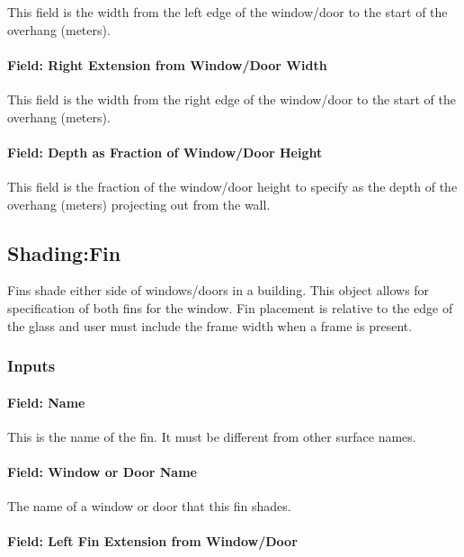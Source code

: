 This field is the width from the left edge of the window/door to the start of the overhang (meters).

\paragraph{Field: Right Extension from Window/Door Width}\label{field-right-extension-from-windowdoor-width-1}

This field is the width from the right edge of the window/door to the start of the overhang (meters).

\paragraph{Field: Depth as Fraction of Window/Door Height}\label{field-depth-as-fraction-of-windowdoor-height}

This field is the fraction of the window/door height to specify as the depth of the overhang (meters) projecting out from the wall.

\subsection{Shading:Fin}\label{shadingfin}

Fins shade either side of windows/doors in a building. This object allows for specification of both fins for the window. Fin placement is relative to the edge of the glass and user must include the frame width when a frame is present.

\subsubsection{Inputs}\label{inputs-28-002}

\paragraph{Field: Name}\label{field-name-26-003}

This is the name of the fin. It must be different from other surface names.

\paragraph{Field: Window or Door Name}\label{field-window-or-door-name-2}

The name of a window or door that this fin shades.

\paragraph{Field: Left Fin Extension from Window/Door}\label{field-left-fin-extension-from-windowdoor}

